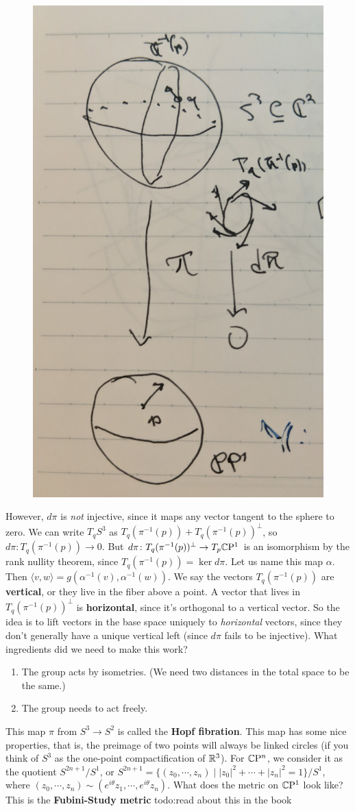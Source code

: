 \begin{figure}[H]
\centering
\includegraphics[width=0.3\linewidth]{figures/rgeo_lec4.jpg}
\end{figure}

However, $d\pi$ is \emph{not} injective, since it maps any vector tangent to the sphere to zero. We can write $T_q S^3$ as $T_q (\pi ^{-1}(p))+T_q(\pi ^{-1}(p))^{\perp}$, so $d\pi \colon T_q(\pi ^{-1}(p)) \to 0$. But $d\pi \colon T_q(\pi ^{-1}(p))^{\perp} \to T_p \mathbb{C} \mathrm P^1$ is an isomorphism by the rank nullity theorem, since $T_q(\pi ^{-1}(p))=\ker d\pi$. Let us name this map $\alpha $. Then $\langle v,w \rangle =g(\alpha ^{-1}(v),\alpha ^{-1}(w))$. We say the vectors $T_q(\pi ^{-1}(p))$ are \textbf{vertical}, or they live in the fiber above a point. A vector that lives in $T_q(\pi ^{-1}(p))^{\perp}$ is \textbf{horizontal}, since it's orthogonal to a vertical vector. So the idea is to lift vectors in the base space uniquely to \emph{horizontal} vectors, since they don't generally have a unique vertical left (since $d\pi$ fails to be injective). What ingredients did we need to make this work?
\begin{enumerate}[label=(\arabic*)]
    \item The group acts by isometries. (We need two distances in the total space to be the same.)
    \item The group needs to act freely.
\end{enumerate}
This map $\pi$ from $S^3\to S^2$ is called the \textbf{Hopf fibration}. This map has some nice properties, that is, the preimage of two points will always be linked circles (if you think of $S^3$ as the one-point compactification of $\mathbb{R}^3$). For $\mathbb{C}\mathrm P^n $, we consider it as the quotient $S^{2n+1} / S^1 $, or $S^{2n+1}=\{(z_0,\cdots ,z_n )\mid |z_0|^2+\cdots +|z_n |^2=1\} / S^1 $, where $(z_0,\cdots ,z_n )\sim (e^{i\theta}z_1,\cdots ,e^{i\theta}z_n )$. What does the metric on $\mathbb{C}\mathrm P^1$ look like? This is the \textbf{Fubini-Study metric} {\color{red}todo:read about this in the book} 
